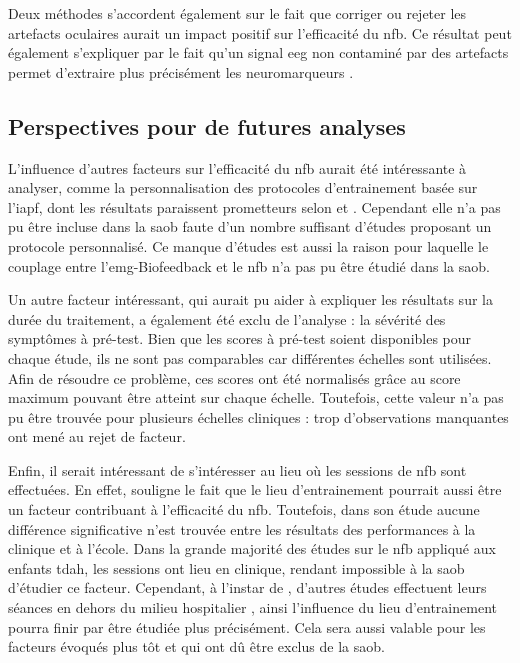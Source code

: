Deux méthodes s'accordent également sur le fait que corriger ou rejeter les artefacts oculaires aurait un impact positif sur l'efficacité du \gls{nfb}. Ce résultat peut également
s'expliquer par le fait qu'un signal \gls{eeg} non contaminé par des artefacts permet d'extraire plus précisément les neuromarqueurs \citep{Barthelemy2019}. %



\subsection{Perspectives pour de futures analyses}

L'influence d'autres facteurs sur l'efficacité du \gls{nfb} aurait été intéressante à analyser, comme la personnalisation des protocoles d'entrainement basée sur l'\gls{iapf},
dont les résultats paraissent prometteurs selon \citet{Bazanova2018} et \citet{Escolano2014}. Cependant elle n'a pas pu être incluse dans la \gls{saob} faute d'un 
nombre suffisant d'études proposant un protocole personnalisé. Ce manque d'études est aussi la raison pour laquelle le couplage entre l'\gls{emg}-Biofeedback et le 
\gls{nfb} n'a pas pu être étudié dans la \gls{saob}. 

Un autre facteur intéressant, qui aurait pu aider à expliquer les résultats sur la durée du traitement, a 
également été exclu de l'analyse : la sévérité des symptômes à pré-test. Bien que les scores à pré-test soient disponibles pour chaque étude, ils ne sont pas
comparables car différentes échelles sont utilisées. Afin de résoudre ce problème, ces scores ont été normalisés grâce au score maximum pouvant être atteint
sur chaque échelle. Toutefois, cette valeur n'a pas pu être trouvée pour plusieurs échelles cliniques : trop d'observations manquantes ont mené au rejet de facteur.

Enfin, il serait intéressant de s'intéresser au lieu où les sessions de \gls{nfb} sont effectuées. En effet, \citet{Minder2018} souligne le fait que le lieu
d'entrainement pourrait aussi être un facteur contribuant à l'efficacité du \gls{nfb}. Toutefois, dans son étude aucune différence significative n'est trouvée entre
les résultats des performances à la clinique et à l'école. Dans la grande majorité des études sur le \gls{nfb} appliqué aux enfants
\gls{tdah}, les sessions ont lieu en clinique, rendant impossible à la \gls{saob} d'étudier ce facteur. Cependant, à l'instar de \citet{Minder2018}, d'autres 
études effectuent leurs séances en dehors du milieu hospitalier \citep{Bioulac2019}, ainsi l'influence du lieu d'entrainement pourra finir par être étudiée
plus précisément. Cela sera aussi valable pour les facteurs évoqués plus tôt et qui ont dû être exclus de la \gls{saob}.

